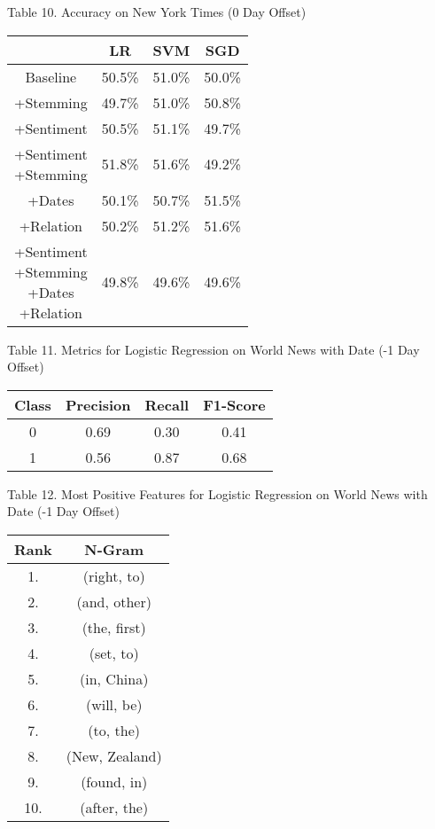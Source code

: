 \documentclass[11pt,a4paper]{article}
\begin{document}
\begin{center}
Table 10. Accuracy on New York Times (0 Day Offset)\\
\begin{tabular}{ |c|c|c|c| }
 \hline
  & LR & SVM & SGD \\
  \hline
  Baseline & 50.5\% & 51.0\% & 50.0\% \\
  \hline
 +Stemming & 49.7\% & 51.0\% & 50.8\% \\
  \hline
 +Sentiment & 50.5\% & 51.1\%  & 49.7\% \\
  \hline
  \shortstack{+Sentiment \\ +Stemming} & 51.8\% & 51.6\% & 49.2\%\\
 \hline
 +Dates & 50.1\% & 50.7\% & 51.5\% \\
  \hline
 +Relation & 50.2\% & 51.2\% & 51.6\% \\
  \hline
  \shortstack{+Sentiment \\ +Stemming \\+Dates \\+Relation} & 49.8\% & 49.6\% & 49.6\% \\
 \hline
\end{tabular}
\end{center}

\begin{center}
Table 11. Metrics for Logistic Regression on World News with Date (-1 Day Offset)
\begin{tabular}{ |c|c|c|c| }
 \hline
  Class & Precision & Recall & F1-Score\\
  \hline
  0 & 0.69 & 0.30 & 0.41\\
  \hline
  1 & 0.56 & 0.87 & 0.68\\
 \hline
\end{tabular}
\end{center}

\begin{center}
Table 12. Most Positive Features for Logistic Regression on World News with Date (-1 Day Offset)\\
\begin{tabular}{ |c|c| }
 \hline
 Rank & N-Gram\\
 \hline
 1. & (right, to)\\
 2. & (and, other)\\
 3. & (the, first)\\
 4. & (set, to)\\
 5. & (in, China)\\
 6. & (will, be)\\
 7. & (to, the)\\
 8. & (New, Zealand)\\
 9. & (found, in)\\
 10. & (after, the)\\
 \hline
\end{tabular}
\end{center}
\end{document}

